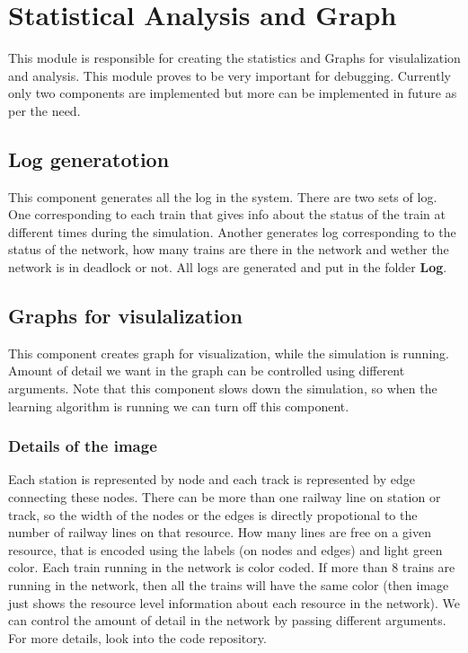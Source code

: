 \chapter{Statistical Analysis and Graph}

This module is responsible for creating the statistics and Graphs for visulalization and analysis. This 
module proves to be very important for debugging. Currently only two components are implemented but more
can be implemented in future as per the need.

\section{Log generatotion}
This component generates all the log in the system. There are two sets of log. One corresponding to each train that gives 
info about the status of the train at different times during the simulation. Another generates log corresponding 
to the status of the network, how many trains are there in the network and wether the network is in deadlock or not. All 
logs are generated and put in the folder \textbf{Log}.

\section{Graphs for visulalization}
This component creates graph for visualization, while the simulation is running. Amount of detail 
we want in the graph can be controlled using different arguments. Note that this component slows down the simulation,
so when the learning algorithm is running we can turn off this component.

\subsection{Details of the image} 
Each station is represented by node and each track is represented by edge
connecting these nodes. There can be more than one railway line on station or track, so the width of the 
nodes or the edges is directly propotional to the number of railway lines on that resource. How many lines 
are free on a given resource, that is encoded using the labels (on nodes and edges) and light green color. 
Each train running in the network is color coded. If more than 8 trains are running in the network, then all the trains
will have the same color (then image just shows the resource level information about each resource in the network).
We can control the amount of detail in the network by passing different arguments. For more details, look into the 
code repository. 


